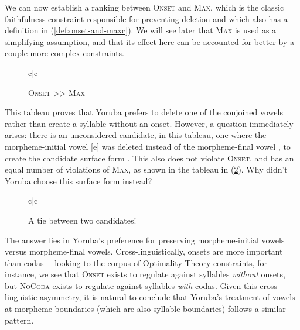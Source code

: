 \documentclass[12pt]{article}
\newcommand{\maxc}{\textsc{Max}}
\newcommand{\onset}{\textsc{Onset}}
\newcommand{\nocoda}{\textsc{NoCoda}}
\newcommand{\pref}[1]{(\ref{#1})}
\begin{document}
We can now establish a ranking between \onset{} and \maxc, which is the
classic faithfulness constraint responsible for preventing deletion and which
also has a definition in \pref{def:onset-and-maxc}. We will see later that
\maxc{} is used as a simplifying assumption, and that its effect here can
be accounted for better by a couple more complex constraints.

\begin{figure}[h]
    \caption{\onset{} >> \maxc}
    \label{tableau:onset-wins}
    \begin{tableau}{c|c}
               \const{\onset} \const{\maxc}
         \vio{}         \vio{*}
                 \vio{*!}       \vio{}
    \end{tableau}
\end{figure}

This tableau proves that Yoruba prefers to delete one of the conjoined vowels
rather than create a syllable without an onset. However, a question immediately
arises: there is an unconsidered candidate, in this tableau, one where the
morpheme-initial vowel [e] was deleted instead of the morpheme-final vowel
\textipa{[E]}, to create the candidate surface form
\textipa{[\textdyoghlig{}E.d\'e]}. This also does not violate \onset, and has
an equal number of violations of \maxc, as shown in the tableau in
\pref{tableau:onset-maxc-tie}. Why didn't Yoruba choose this surface form
instead?

\begin{figure}[h]
    \caption{A tie between two candidates!}
    \label{tableau:onset-maxc-tie}
    \begin{tableau}{c|c}
         \const{\onset} \const{\maxc}
             \vio{}         \vio{*}
              \vio{}         \vio{*}
    \end{tableau}
\end{figure}

The answer lies in Yoruba's preference for preserving morpheme-initial vowels
versus morpheme-final vowels. Cross-linguistically, onsets are more important
than codas--- looking to the corpus of Optimality Theory constraints, for
instance, we see that \onset{} exists to regulate against syllables
\textit{without} onsets, but \nocoda{} exists to regulate against syllables
\textit{with} codas. Given this cross-linguistic asymmetry, it is natural to
conclude that Yoruba's treatment of vowels at morpheme boundaries (which are
also syllable boundaries) follows a similar pattern.
\end{document}
